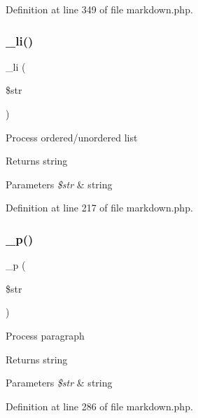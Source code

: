 Definition at line 349 of file markdown.\+php.

\hypertarget{class_markdown_acd211dbc64fbdc856e4abd46670f6993}{}\label{class_markdown_acd211dbc64fbdc856e4abd46670f6993} 
\subsubsection{\texorpdfstring{\+\_\+li()}{\_li()}}
{\footnotesize\ttfamily \+\_\+li (\begin{DoxyParamCaption}\item[{}]{\$str }\end{DoxyParamCaption})\hspace{0.3cm}{\ttfamily [protected]}}

Process ordered/unordered list \begin{DoxyReturn}{Returns}
string 
\end{DoxyReturn}

\begin{DoxyParams}{Parameters}
{\em \$str} & string \\
\hline
\end{DoxyParams}


Definition at line 217 of file markdown.\+php.

\hypertarget{class_markdown_a82a2bccde5a674e56ab6c6c3be76273c}{}\label{class_markdown_a82a2bccde5a674e56ab6c6c3be76273c} 
\subsubsection{\texorpdfstring{\+\_\+p()}{\_p()}}
{\footnotesize\ttfamily \+\_\+p (\begin{DoxyParamCaption}\item[{}]{\$str }\end{DoxyParamCaption})\hspace{0.3cm}{\ttfamily [protected]}}

Process paragraph \begin{DoxyReturn}{Returns}
string 
\end{DoxyReturn}

\begin{DoxyParams}{Parameters}
{\em \$str} & string \\
\hline
\end{DoxyParams}


Definition at line 286 of file markdown.\+php.

